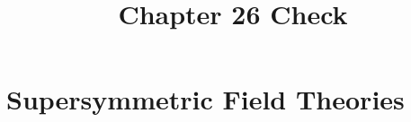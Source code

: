 \documentclass[11pt,a4paper]{article}
\title{Chapter 26 Check}
\author{}
\numberwithin{equation}{subsection}
\begin{document}
\maketitle
\setcounter{section}{25}
\section{Supersymmetric Field Theories}











\end{document}
